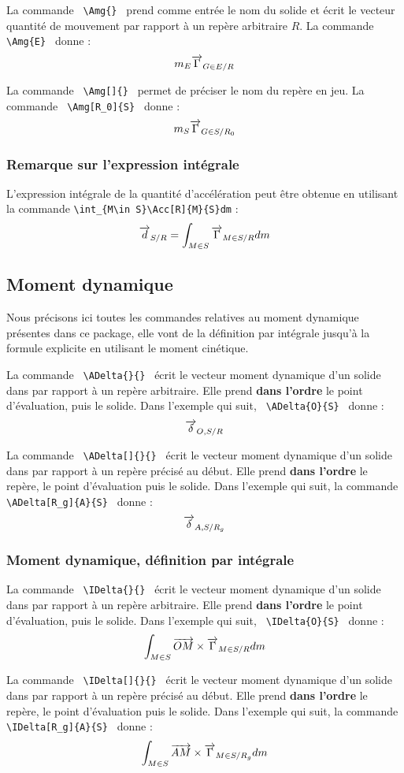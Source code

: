 \documentclass[12pt]{article}
\begin{document}
La commande \verb| \Amg{} | prend comme entrée le nom du solide et écrit le vecteur quantité de mouvement par rapport à un repère arbitraire $R$. La commande  \verb| \Amg{E} | donne : $$\Amg{E}$$

La commande \verb| \Amg[]{} | permet de préciser le nom du repère en jeu. La commande  \verb| \Amg[R_0]{S} | donne : $$\Amg[R_0]{S}$$

\subsubsection{Remarque sur l'expression intégrale}

L'expression intégrale de la quantité d'accélération peut être obtenue en utilisant la commande \verb|\int_{M\in S}\Acc[R]{M}{S}dm| : $$\Am{S}=\int_{M\in S}\Acc{M}{S}dm$$

\subsection{Moment dynamique}
Nous précisons ici toutes les commandes relatives au moment dynamique présentes dans ce package, elle vont de la définition par intégrale jusqu'à la formule explicite en utilisant le moment cinétique.
\vspace{12pt}

La commande \verb| \ADelta{}{} | écrit le vecteur moment dynamique d'un solide dans par rapport à un repère arbitraire. Elle prend \textbf{dans l'ordre} le point d'évaluation, puis le solide. Dans l'exemple qui suit, \verb| \ADelta{O}{S} | donne : $$\ADelta{O}{S}$$

La commande \verb| \ADelta[]{}{} | écrit le vecteur moment dynamique d'un solide dans par rapport à un repère précisé au début. Elle prend \textbf{dans l'ordre} le repère, le point d'évaluation puis le solide. Dans l'exemple qui suit, la commande \verb| \ADelta[R_g]{A}{S} | donne : $$\ADelta[R_g]{A}{S}$$

\subsubsection{Moment dynamique, définition par intégrale}
La commande \verb| \IDelta{}{} | écrit le vecteur moment dynamique d'un solide dans par rapport à un repère arbitraire. Elle prend \textbf{dans l'ordre} le point d'évaluation, puis le solide. Dans l'exemple qui suit, \verb| \IDelta{O}{S} | donne : $$\IDelta{O}{S}$$

La commande \verb| \IDelta[]{}{} | écrit le vecteur moment dynamique d'un solide dans par rapport à un repère précisé au début. Elle prend \textbf{dans l'ordre} le repère, le point d'évaluation puis le solide. Dans l'exemple qui suit, la commande \verb| \IDelta[R_g]{A}{S} | donne : $$\IDelta[R_g]{A}{S}$$
\end{document}
